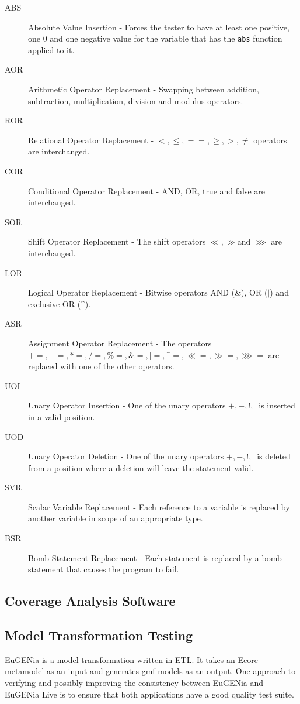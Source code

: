 \begin{description}
\item[ABS] Absolute Value Insertion - Forces the tester to have at least one positive, one 0 and one negative value for the variable that has the \verb+abs+ function applied to it.
\item[AOR] Arithmetic Operator Replacement - Swapping between addition, subtraction, multiplication, division and modulus operators.
\item[ROR] Relational Operator Replacement - $<, \leq, ==, \geq, >, \neq$ operators are interchanged.
\item[COR] Conditional Operator Replacement - AND, OR, true and false are interchanged.
\item [SOR] Shift Operator Replacement - The shift operators $\ll,\gg $and $\ggg$ are interchanged.
\item[LOR] Logical Operator Replacement - Bitwise operators AND (\&), OR ($\mid$) and exclusive OR (\^{}).
\item[ASR] Assignment Operator Replacement - The operators $+=, -=, *=, /=, \%=, \&=, |=, \^{}=, \ll=, \gg=, \ggg=$ are replaced with one of the other operators.
\item[UOI] Unary Operator Insertion - One of the unary operators $+, -, !, ~ $ is inserted in a valid position.
\item[UOD] Unary Operator Deletion - One of the unary operators $+, -, !, ~ $ is deleted from a position where a deletion will leave the statement valid.
\item[SVR] Scalar Variable Replacement - Each reference to a variable is replaced by another variable in scope of an appropriate type.
\item[BSR] Bomb Statement Replacement - Each statement is replaced by a bomb statement that causes the program to fail.
\end{description}

\citet{softwareTestingIntro} 
\subsection{Coverage Analysis Software}

\subsection{Model Transformation Testing}

EuGENia is a model transformation written in ETL. It takes an Ecore metamodel as an input and generates gmf models as an output\citep{eugeniaSite}. One approach to verifying and possibly improving the consistency between EuGENia and EuGENia Live is to ensure that both applications have a good quality test suite.

